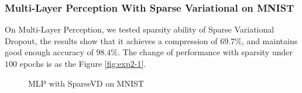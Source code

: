 \documentclass{article}
\begin{document}
	\subsubsection{Multi-Layer Perception With Sparse Variational on MNIST}
	On Multi-Layer Perception, we tested sparsity ability of Sparse Variational Dropout, the results show that it achieves a compression of $69.7\%$, and maintains good enough accuracy of $98.4\%$. The change of performance with sparsity under $100$ epochs is as the Figure {\ref{fig:exp2-1}}.
		\begin{figure}[ht]
			\centering
			\caption{MLP with SparseVD on MNIST}
			\label{fig:exp2}
		\end{figure}	
\end{document}
